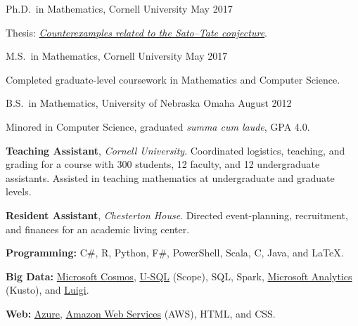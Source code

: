 \documentclass[11pt, letterpaper]{awesome-cv}
\begin{document}

\begin{cventries}

\cventry
	{Ph.D.~in Mathematics, Cornell University}
	{}{}
	{May 2017}
	{
		\begin{cvitems}
			\item{Thesis: \href{http://doi.org/10.7298/X4PN93Q3}{\emph{Counterexamples related to the Sato--Tate conjecture}}.}
		\end{cvitems}
	}
	
\cventry
	{M.S.~in Mathematics, Cornell University}
	{}{}
	{May 2017}
	{
		\begin{cvitems}
			\item{Completed graduate-level coursework in Mathematics and Computer Science.}
		\end{cvitems}
	}
	
\cventry
	{B.S.~in Mathematics, University of Nebraska Omaha}
	{}{}
	{August 2012}
	{
		\begin{cvitems}
			\item{Minored in Computer Science, graduated \emph{summa cum laude}, GPA 4.0.}
		\end{cvitems}
	}
	
\end{cventries}






\begin{cvparagraph}
\textbf{Teaching Assistant}, \emph{Cornell University}. Coordinated logistics, teaching, and grading for a course with 300 students, 12 faculty, and 12 undergraduate assistants.
Assisted in teaching mathematics at undergraduate and graduate levels.

\textbf{Resident Assistant}, \emph{Chesterton House}. Directed event-planning, recruitment, and finances for an academic living center. 
\end{cvparagraph}






\begin{cvparagraph}
\textbf{Programming:} C\#, R, Python, F\#, PowerShell, Scala, C, Java, and \LaTeX.

\textbf{Big Data:}
\href{https://docs.microsoft.com/en-us/azure/cosmos-db/introduction}{Microsoft Cosmos}, 
\href{https://doi.org/10.14778/1454159.1454166}{U-SQL} (Scope),
SQL,
Spark,
\href{https://docs.loganalytics.io/docs/Language-Reference}{Microsoft Analytics} (Kusto),
and 
\href{https://github.com/spotify/luigi}{Luigi}.

\textbf{Web:} 
\href{https://azure.microsoft.com/}{Azure}, 
\href{https://aws.amazon.com/}{Amazon Web Services} (AWS), 
HTML, and CSS.
\end{cvparagraph}
\end{document}
